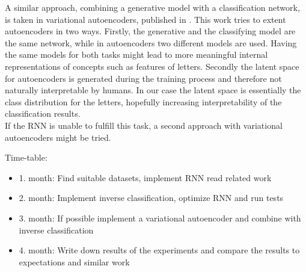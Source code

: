 \begin{titlepage}
A similar approach, combining a generative model with a classification network, is taken in variational autoencoders, published in \autocite{VAE2017}. This work tries to extent autoencoders in two ways. Firstly, the generative and the classifying model are the same network, while in autoencoders two different models are used. Having the same models for both tasks might lead to more meaningful internal representations of concepts such as features of letters. Secondly the latent space for autoencoders is generated during the training process and therefore not naturally interpretable by humans. In our case the latent space is essentially the class distribution for the letters, hopefully increasing interpretability of the classification results. \\

If the RNN is unable to fulfill this task, a second approach with variational autoencoders might be tried. 

 




\vspace{8pt}

Time-table: 
\vspace{-8pt}
\begin{itemize}
	\item 1. month: Find suitable datasets, implement RNN read related work
	\item 2. month: Implement inverse classification, optimize RNN and run tests
	\item 3. month: If possible implement a variational autoencoder and combine with inverse classification
	\item 4. month: Write down results of the experiments and compare the results to expectations and similar work
\end{itemize}
%
\printbibliography
\end{titlepage}
